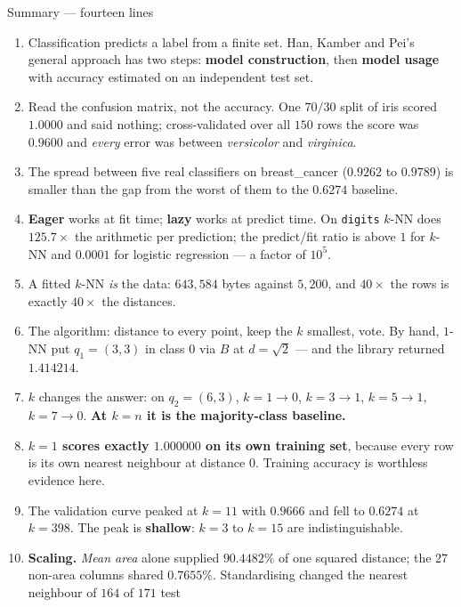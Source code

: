 \documentclass[aspectratio=169]{beamer}
\begin{document}
\begin{frame}[shrink=16]{Summary --- fourteen lines}
  \begin{enumerate}\small
    \item Classification predicts a label from a finite set. Han, Kamber and
      Pei's general approach has two steps: \textbf{model construction}, then
      \textbf{model usage} with accuracy estimated on an independent test set.
    \item Read the confusion matrix, not the accuracy. One $70/30$ split of
      iris scored $1.0000$ and said nothing; cross-validated over all $150$
      rows the score was $0.9600$ and \emph{every} error was between
      \emph{versicolor} and \emph{virginica}.
    \item The spread between five real classifiers on breast\_cancer
      ($0.9262$ to $0.9789$) is smaller than the gap from the worst of them to
      the $0.6274$ baseline.
    \item \textbf{Eager} works at fit time; \textbf{lazy} works at predict
      time. On \texttt{digits} $k$-NN does $125.7\times$ the arithmetic per
      prediction; the predict/fit ratio is above $1$ for $k$-NN and
      $0.0001$ for logistic regression --- a factor of $10^{5}$.
    \item A fitted $k$-NN \emph{is} the data: $643{,}584$ bytes against
      $5{,}200$, and $40\times$ the rows is exactly $40\times$ the distances.
    \item The algorithm: distance to every point, keep the $k$ smallest, vote.
      By hand, $1$-NN put $q_1 = (3,3)$ in class $0$ via $B$ at $d=\sqrt{2}$
      --- and the library returned $1.414214$.
    \item $k$ changes the answer: on $q_2 = (6,3)$, $k=1 \to 0$,
      $k=3 \to 1$, $k=5 \to 1$, $k=7 \to 0$. \textbf{At $k = n$ it is the
      majority-class baseline.}
    \item \textbf{$k=1$ scores exactly $1.000000$ on its own training set},
      because every row is its own nearest neighbour at distance $0$. Training
      accuracy is worthless evidence here.
    \item The validation curve peaked at $k=11$ with $0.9666$ and fell to
      $0.6274$ at $k=398$. The peak is \textbf{shallow}: $k=3$ to $k=15$ are
      indistinguishable.
    \item \textbf{Scaling.} \emph{Mean area} alone supplied $90.4482\%$ of one
      squared distance; the $27$ non-area columns shared $0.7655\%$.
      Standardising changed the nearest neighbour of $164$ of $171$ test

\end{enumerate}
\end{frame}
\end{document}
